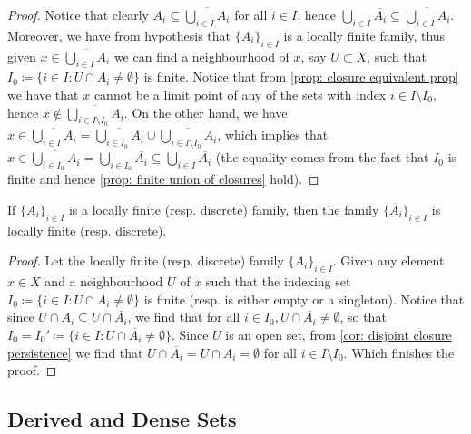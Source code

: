 \begin{proof}
Notice that clearly \(A_i \subseteq \overline{\bigcup_{i \in  I} A_i}\) for
all \(i \in I\), hence \(\bigcup_{i \in  I} \overline{A_i} \subseteq
\overline{\bigcup_{i \in I} A_i}\). Moreover, we have from hypothesis that
\(\{A_i\}_{i \in I}\) is a locally finite family, thus given \(x \in
\overline{\bigcup_{i \in  I} A_i}\) we can find a neighbourhood of \(x\), say
\(U \subset X\), such that \(I_0 \coloneq \{i \in I \colon U \cap A_i \neq \emptyset\}\)
is finite. Notice that from \cref{prop: closure equivalent prop} we have that
\(x\) cannot be a limit point of any of the sets with index \(i \in I
\setminus I_0\), hence \(x \not\in \overline{\bigcup_{i \in  I \setminus I_0}
A_i}\). On the other hand, we have \(x \in \overline{\bigcup_{i \in  I} A_i} =
\overline{\bigcup_{i \in  I_0} A_i} \cup \overline{\bigcup_{i \in  I \setminus
I_0} A_i}\), which implies that \(x \in \overline{\bigcup_{i \in  I_0} A_i} =
\bigcup_{i \in  I_0} \overline{A_i} \subseteq \bigcup_{i \in  I}
\overline{A_i}\) (the equality comes from the fact that \(I_0\) is finite and
hence \cref{prop: finite union of closures} hold).
\end{proof}

\begin{proposition}
If \(\{A_i\}_{i \in I}\) is a locally finite (resp. discrete) family, then the
family \(\{\overline{A_i}\}_{i \in I}\) is locally finite (resp. discrete).
\end{proposition}

\begin{proof}
Let the locally finite (resp. discrete) family \(\{A_i\}_{i \in I}\). Given
any element \(x \in X\) and a neighbourhood \(U\) of \(x\) such that the
indexing set \(I_0 \coloneq \{i \in I \colon U \cap A_i \neq \emptyset\}\) is finite
(resp. is either empty or a singleton). Notice that since \(U \cap A_i
\subseteq U \cap \overline{A_i}\), we find that for all \(i \in I_0, U \cap
\overline{A_i} \neq \emptyset\), so that \(I_0 = I_0' \coloneq \{i \in I \colon U \cap
\overline{A_i} \neq \emptyset\}\). Since \(U\) is an open set, from \cref{cor:
disjoint closure persistence} we find that \(U \cap \overline{A_i} = U \cap
A_i = \emptyset\) for all \(i \in I \setminus I_0\). Which finishes the proof.
\end{proof}

\subsection{Derived and Dense Sets}

